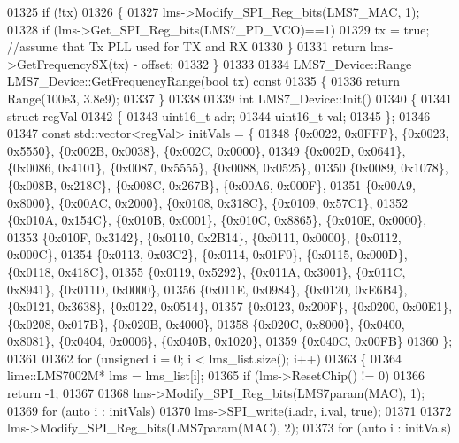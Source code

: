 \begin{DoxyCode}
{{{01325    \textcolor{keywordflow}{if} (!tx)
01326    \{
01327         lms->Modify_SPI_Reg_bits(LMS7_MAC, 1);
01328         \textcolor{keywordflow}{if} (lms->Get_SPI_Reg_bits(LMS7_PD_VCO)==1)
01329             tx = \textcolor{keyword}{true}; \textcolor{comment}{//assume that Tx PLL used for TX and RX}
01330    \}
01331    \textcolor{keywordflow}{return} lms->GetFrequencySX(tx) - offset;
01332 \}
01333 
01334 LMS7_Device::Range LMS7_Device::GetFrequencyRange(\textcolor{keywordtype}{bool} tx)\textcolor{keyword}{ const}
01335 \textcolor{keyword}{}\{
01336     \textcolor{keywordflow}{return} Range(100e3, 3.8e9);
01337 \}
01338 
01339 \textcolor{keywordtype}{int} LMS7_Device::Init()
01340 \{
01341     \textcolor{keyword}{struct }regVal
01342     \{
01343         uint16\_t adr;
01344         uint16\_t val;
01345     \};
01346 
01347     \textcolor{keyword}{const} std::vector<regVal> initVals = \{
01348         \{0x0022, 0x0FFF\}, \{0x0023, 0x5550\}, \{0x002B, 0x0038\}, \{0x002C, 0x0000\},
01349         \{0x002D, 0x0641\}, \{0x0086, 0x4101\}, \{0x0087, 0x5555\}, \{0x0088, 0x0525\},
01350         \{0x0089, 0x1078\}, \{0x008B, 0x218C\}, \{0x008C, 0x267B\}, \{0x00A6, 0x000F\},
01351         \{0x00A9, 0x8000\}, \{0x00AC, 0x2000\}, \{0x0108, 0x318C\}, \{0x0109, 0x57C1\},
01352         \{0x010A, 0x154C\}, \{0x010B, 0x0001\}, \{0x010C, 0x8865\}, \{0x010E, 0x0000\},
01353         \{0x010F, 0x3142\}, \{0x0110, 0x2B14\}, \{0x0111, 0x0000\}, \{0x0112, 0x000C\},
01354         \{0x0113, 0x03C2\}, \{0x0114, 0x01F0\}, \{0x0115, 0x000D\}, \{0x0118, 0x418C\},
01355         \{0x0119, 0x5292\}, \{0x011A, 0x3001\}, \{0x011C, 0x8941\}, \{0x011D, 0x0000\},
01356         \{0x011E, 0x0984\}, \{0x0120, 0xE6B4\}, \{0x0121, 0x3638\}, \{0x0122, 0x0514\},
01357         \{0x0123, 0x200F\}, \{0x0200, 0x00E1\}, \{0x0208, 0x017B\}, \{0x020B, 0x4000\},
01358         \{0x020C, 0x8000\}, \{0x0400, 0x8081\}, \{0x0404, 0x0006\}, \{0x040B, 0x1020\},
01359         \{0x040C, 0x00FB\}
01360     \};
01361 
01362     \textcolor{keywordflow}{for} (\textcolor{keywordtype}{unsigned} i = 0; i < lms_list.size(); i++)
01363     \{
01364         lime::LMS7002M* lms = lms_list[i];
01365         \textcolor{keywordflow}{if} (lms->ResetChip() != 0)
01366             \textcolor{keywordflow}{return} -1;
01367 
01368         lms->Modify_SPI_Reg_bits(LMS7param(MAC), 1);
01369         \textcolor{keywordflow}{for} (\textcolor{keyword}{auto} i : initVals)
01370             lms->SPI_write(i.adr, i.val, \textcolor{keyword}{true});
01371 
01372         lms->Modify_SPI_Reg_bits(LMS7param(MAC), 2);
01373         \textcolor{keywordflow}{for} (\textcolor{keyword}{auto} i : initVals)
}}}
\end{DoxyCode}
